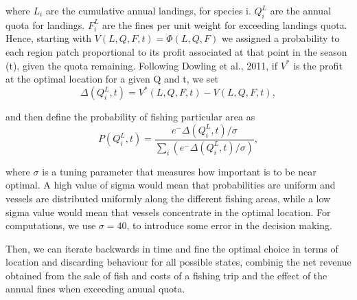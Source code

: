 \documentclass[12pt,oneline,a4paper,numbib]{ouparticle}
\begin{document}
where $L_i$ are the cumulative annual landings, for species i. $Q_i^L$ are the annual quota for landings. $F_i^L$ are the fines per unit weight for exceeding landings quota. Hence, starting with $V (L, Q, F, t) = \Phi (L, Q, F)$ we assigned a probability to each region patch proportional to its profit associated at that point in the season (t), given the quota remaining. Following Dowling et al., 2011, if $V^\ast$ is the profit at the optimal location for a given Q and t, we set
\begin{equation*}
\Delta (Q_i^L, t) = V^\ast (L, Q, F, t) - V (L, Q, F, t),
\end{equation*}

and then define the probability of fishing particular area as
\begin{equation*}
P (Q_i^L, t) = \frac{e^-\Delta (Q_i^L, t)/\sigma} {\sum_{i}(e^-\Delta (Q_i^L, t)/\sigma)},
\end{equation*}

where $\sigma$ is a tuning parameter that measures how important is to be near optimal.  A high value of sigma would mean that probabilities are uniform and vessels are distributed uniformly along the different fishing areas, while a low sigma value would mean that vessels concentrate in the optimal location. For computations, we use $\sigma = 40$, to introduce some error in the decision making. 

Then, we can iterate backwards in time and fine the optimal choice in terms of location and discarding behaviour for all possible states, combinig the net revenue obtained from the sale of fish and costs of a fishing trip and the effect of the annual fines when exceeding anuual quota.
\end{document}

